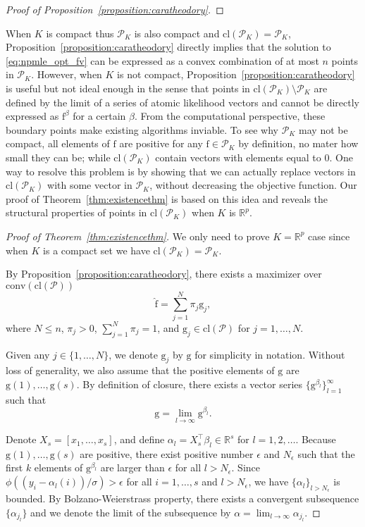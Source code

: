 \documentclass[11pt]{article}
\numberwithin{equation}{section}
\newcommand{\RS}{\mathbb{R}}
\newcommand{\PS}{\mathcal{P}}
\newcommand{\T}{ \top }
\newcommand{\fv}{\mathrm{f}}
\newcommand{\gv}{\mathrm{g}}
\begin{document}
\begin{appendices}
\begin{proof}[Proof of Proposition~\ref{proposition:caratheodory}]
\end{proof}

When $K$ is compact thus $\PS_K$ is also compact and $\mathrm{cl}(\PS_K) = \PS_K$, Proposition~\ref{proposition:caratheodory} directly implies that the solution to \eqref{eq:npmle_opt_fv} can be expressed as a convex combination of at most $n$ points in $\PS_K$. However, when $K$ is not compact, Proposition~\ref{proposition:caratheodory} is useful but not ideal enough in the sense that points in $\mathrm{cl}({\PS_K}) \setminus \PS_K$ are defined by the limit of a series of atomic likelihood vectors and cannot be directly expressed as $\fv^\beta$ for a certain $\beta$. From the computational perspective, these boundary points make existing algorithms inviable. To see why $\PS_K$ may not be compact, all elements of $\fv$ are positive for any $\fv \in \PS_K$ by definition, no mater how small they can be; while $\mathrm{cl}(\PS_K)$ contain vectors with elements equal to $0$. One way to resolve this problem is by showing that we can actually replace vectors in $\mathrm{cl}(\PS_K)$ with some vector in $\PS_K$, without decreasing the objective function. Our proof of Theorem~\ref{thm:existencethm} is based on this idea and reveals the structural properties of points in $\mathrm{cl}(\PS_K)$ when $K$ is $\RS^p$.

\begin{proof}[Proof of Theorem~\ref{thm:existencethm}]

We only need to prove $K = \RS^p$ case since when $K$ is a compact set we have $\mathrm{cl}(\PS_K) = \PS_K$.

By Proposition~\ref{proposition:caratheodory}, there exists a maximizer over $\mathrm{conv}(\mathrm{cl} (\PS))$
\[
\hat{\fv} = \sum_{j=1}^{N} \pi_j \gv_j,
\]
where $N\leq n$, $\pi_j > 0$, $\sum_{j=1}^{N} \pi_j =1$, and $\gv_j \in \mathrm{cl}(\PS)$ for $j = 1, \dots, N$.

Given any $j\in \{1,\dots, N\}$, we denote $\gv_j$ by $\gv$ for simplicity in notation. Without loss of generality, we also assume that the positive elements of $\gv$ are $\gv(1),\dots,\gv(s)$. By definition of closure, there exists a vector series $
\{ \gv^{\beta_l}\}_{l=1}^\infty$
such that
\[
\gv = \lim_{l\rightarrow \infty} \gv^{\beta_l}.
\]

Denote $X_s= [x_1,\dots,x_s]$, and define $\alpha_l = X_s^\T \beta_l\in \RS^s$ for $l = 1,2,\dots$. Because $\gv(1),\dots,\gv(s)$ are positive, there exist positive number $\epsilon$ and $N_\epsilon$ such that the first $k$ elements of $\gv^{\beta_l}$ are larger than $\epsilon$ for all $l>N_\epsilon$. Since $\phi((y_i - \alpha_l(i))/\sigma)>\epsilon$ for all $i =1,\dots, s$ and $l > N_\epsilon$, we have $\{ \alpha_l\}_{l>N_\epsilon}$ is bounded. By Bolzano-Weierstrass property, there exists a convergent subsequence $\{ \alpha_{j_l} \}$ and we denote the limit of the subsequence by $\alpha = \lim_{l \rightarrow \infty} \alpha_{j_l}$.


\end{proof}
\end{appendices}
\end{document}

